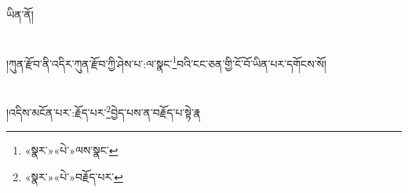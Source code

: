ཡིན་ནོ།\chapter{ }།ཀུན་རྫོབ་ནི་འདིར་ཀུན་རྫོབ་ཀྱི་ཤེས་པ་:ལ་སྣང་\footnote{«སྣར་»«པེ་»ལས་སྣང་}བའི་ངང་ཅན་གྱི་ངོ་བོ་ཡིན་པར་དགོངས་སོ།\chapter{ }།འདིས་མངོན་པར་:རྗོད་པར་\footnote{«སྣར་»«པེ་»བརྗོད་པར་}བྱེད་པས་ན་བརྗོད་པ་སྟེ་རྣ